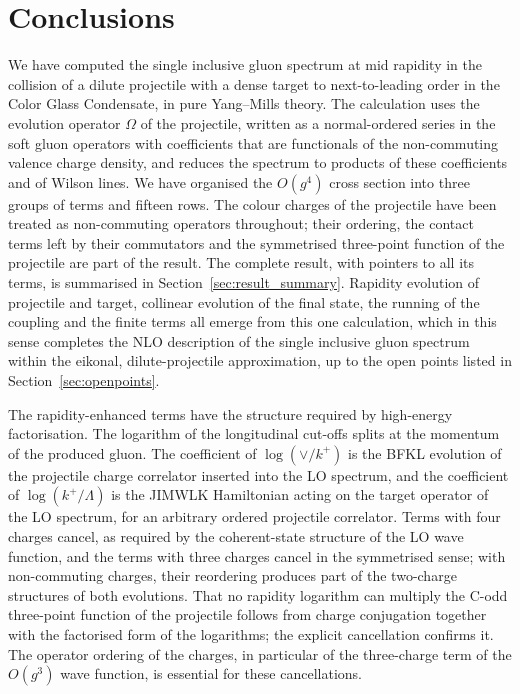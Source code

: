 \section{Conclusions}\label{sec:conclusions}

We have computed the single inclusive gluon spectrum at mid rapidity in the collision of a dilute projectile with a dense target to next-to-leading order in the Color Glass Condensate, in pure Yang--Mills theory. The calculation uses the evolution operator $\Omega$ of the projectile, written as a normal-ordered series in the soft gluon operators with coefficients that are functionals of the non-commuting valence charge density, and reduces the spectrum to products of these coefficients and of Wilson lines. We have organised the $O(g^4)$ cross section into three groups of terms and fifteen rows. The colour charges of the projectile have been treated as non-commuting operators throughout; their ordering, the contact terms left by their commutators and the symmetrised three-point function of the projectile are part of the result. The complete result, with pointers to all its terms, is summarised in Section~\ref{sec:result_summary}. Rapidity evolution of projectile and target, collinear evolution of the final state, the running of the coupling and the finite terms all emerge from this one calculation, which in this sense completes the NLO description of the single inclusive gluon spectrum within the eikonal, dilute-projectile approximation, up to the open points listed in Section~\ref{sec:openpoints}.

The rapidity-enhanced terms have the structure required by high-energy factorisation. The logarithm of the longitudinal cut-offs splits at the momentum of the produced gluon. The coefficient of $\log(\vee/k^+)$ is the BFKL evolution of the projectile charge correlator inserted into the LO spectrum, and the coefficient of $\log(k^+/\Lambda)$ is the JIMWLK Hamiltonian acting on the target operator of the LO spectrum, for an arbitrary ordered projectile correlator. Terms with four charges cancel, as required by the coherent-state structure of the LO wave function, and the terms with three charges cancel in the symmetrised sense; with non-commuting charges, their reordering produces part of the two-charge structures of both evolutions. That no rapidity logarithm can multiply the C-odd three-point function of the projectile follows from charge conjugation together with the factorised form of the logarithms; the explicit cancellation confirms it. The operator ordering of the charges, in particular of the three-charge term of the $O(g^3)$ wave function, is essential for these cancellations.


